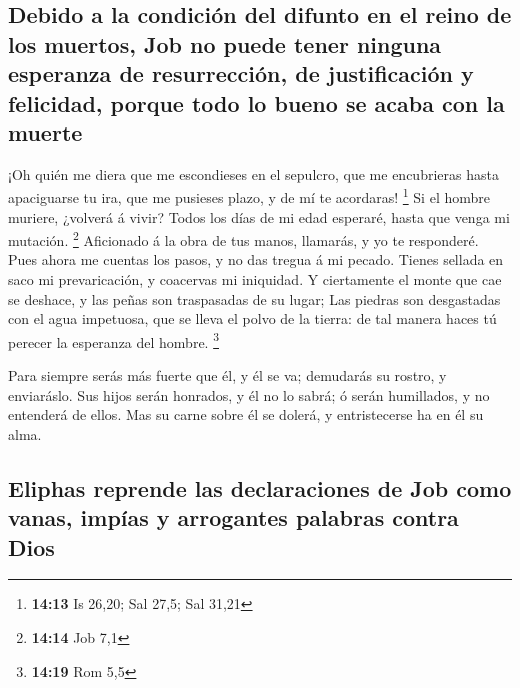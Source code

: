 \hypertarget{debido-a-la-condiciuxf3n-del-difunto-en-el-reino-de-los-muertos-job-no-puede-tener-ninguna-esperanza-de-resurrecciuxf3n-de-justificaciuxf3n-y-felicidad-porque-todo-lo-bueno-se-acaba-con-la-muerte}{%
\subsection{Debido a la condición del difunto en el reino de los
muertos, Job no puede tener ninguna esperanza de resurrección, de
justificación y felicidad, porque todo lo bueno se acaba con la
muerte}\label{debido-a-la-condiciuxf3n-del-difunto-en-el-reino-de-los-muertos-job-no-puede-tener-ninguna-esperanza-de-resurrecciuxf3n-de-justificaciuxf3n-y-felicidad-porque-todo-lo-bueno-se-acaba-con-la-muerte}}

 ¡Oh quién me diera que me escondieses en el sepulcro, que
me encubrieras hasta apaciguarse tu ira, que me pusieses plazo, y de mí
te acordaras! \footnote{\textbf{14:13} Is 26,20; Sal 27,5; Sal 31,21}
 Si el hombre muriere, ¿volverá á vivir? Todos los días de
mi edad esperaré, hasta que venga mi mutación. \footnote{\textbf{14:14}
  Job 7,1}  Aficionado á la obra de tus manos, llamarás, y
yo te responderé.  Pues ahora me cuentas los pasos, y no
das tregua á mi pecado.  Tienes sellada en saco mi
prevaricación, y coacervas mi iniquidad.  Y ciertamente el
monte que cae se deshace, y las peñas son traspasadas de su lugar;
 Las piedras son desgastadas con el agua impetuosa, que se
lleva el polvo de la tierra: de tal manera haces tú perecer la esperanza
del hombre. \footnote{\textbf{14:19} Rom 5,5}

 Para siempre serás más fuerte que él, y él se va;
demudarás su rostro, y enviaráslo.  Sus hijos serán
honrados, y él no lo sabrá; ó serán humillados, y no entenderá de ellos.
 Mas su carne sobre él se dolerá, y entristecerse ha en él
su alma.

\hypertarget{eliphas-reprende-las-declaraciones-de-job-como-vanas-impuxedas-y-arrogantes-palabras-contra-dios}{%
\subsection{Eliphas reprende las declaraciones de Job como vanas, impías
y arrogantes palabras contra
Dios}\label{eliphas-reprende-las-declaraciones-de-job-como-vanas-impuxedas-y-arrogantes-palabras-contra-dios}}

